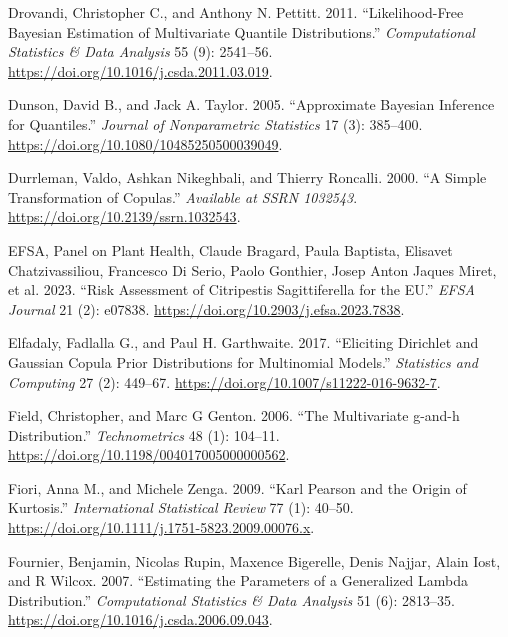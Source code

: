 \documentclass[
]{interact}
\newlength{\cslhangindent}
\newenvironment{CSLReferences}[2] %
 {\begin{list}{}{%
  \setlength{\itemindent}{0pt}
  \setlength{\leftmargin}{0pt}
  \setlength{\parsep}{0pt}
  \ifodd #1
   \setlength{\leftmargin}{\cslhangindent}
   \setlength{\itemindent}{-1\cslhangindent}
  \fi
  \setlength{\itemsep}{#2\baselineskip}}}
 {\end{list}}
\begin{document}
\begin{CSLReferences}{1}{0}
Drovandi, Christopher C., and Anthony N. Pettitt. 2011.
{``Likelihood-Free {Bayesian} Estimation of Multivariate Quantile
Distributions.''} \emph{Computational Statistics \& Data Analysis} 55
(9): 2541--56. \url{https://doi.org/10.1016/j.csda.2011.03.019}.

Dunson, David B., and Jack A. Taylor. 2005. {``Approximate {Bayesian}
Inference for Quantiles.''} \emph{Journal of Nonparametric Statistics}
17 (3): 385--400. \url{https://doi.org/10.1080/10485250500039049}.

Durrleman, Valdo, Ashkan Nikeghbali, and Thierry Roncalli. 2000. {``A
Simple Transformation of Copulas.''} \emph{Available at SSRN 1032543}.
\url{https://doi.org/10.2139/ssrn.1032543}.

EFSA, Panel on Plant Health, Claude Bragard, Paula Baptista, Elisavet
Chatzivassiliou, Francesco Di Serio, Paolo Gonthier, Josep Anton Jaques
Miret, et al. 2023. {``Risk Assessment of {Citripestis} Sagittiferella
for the {EU}.''} \emph{EFSA Journal} 21 (2): e07838.
\url{https://doi.org/10.2903/j.efsa.2023.7838}.

Elfadaly, Fadlalla G., and Paul H. Garthwaite. 2017. {``Eliciting
{Dirichlet} and {Gaussian} Copula Prior Distributions for Multinomial
Models.''} \emph{Statistics and Computing} 27 (2): 449--67.
\url{https://doi.org/10.1007/s11222-016-9632-7}.

Field, Christopher, and Marc G Genton. 2006. {``The {Multivariate}
g-and-h {Distribution}.''} \emph{Technometrics} 48 (1): 104--11.
\url{https://doi.org/10.1198/004017005000000562}.

Fiori, Anna M., and Michele Zenga. 2009. {``Karl {Pearson} and the
Origin of Kurtosis.''} \emph{International Statistical Review} 77 (1):
40--50. \url{https://doi.org/10.1111/j.1751-5823.2009.00076.x}.

Fournier, Benjamin, Nicolas Rupin, Maxence Bigerelle, Denis Najjar,
Alain Iost, and R Wilcox. 2007. {``Estimating the Parameters of a
Generalized Lambda Distribution.''} \emph{Computational Statistics \&
Data Analysis} 51 (6): 2813--35.
\url{https://doi.org/10.1016/j.csda.2006.09.043}.


\end{CSLReferences}
\end{document}
